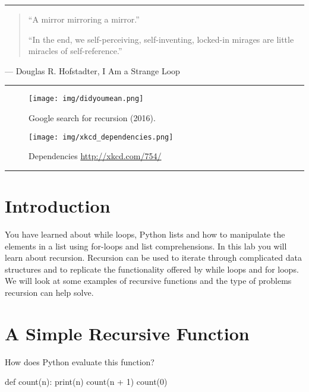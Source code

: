 \documentclass[11pt]{cselabheader}
\title{\thetitle}
\author{\theauthor}
\date{NMT Department of Computer Science and Engineering}
\begin{document}
\maketitle
\hrule


\begin{quote}
``A mirror mirroring a mirror.''

``In the end, we self-perceiving, self-inventing, locked-in mirages
are little miracles of self-reference.''
\end{quote}
\begin{flushright}
--- Douglas R. Hofstadter, I Am a Strange Loop
\end{flushright}

\hrule

\begin{figure}[H]
  \centering
  \texttt{[image: img/didyoumean.png]}
  \caption{Google search for recursion (2016).}
\end{figure}

\begin{figure}[H]
  \centering
  \texttt{[image: img/xkcd\_dependencies.png]}
  \caption{Dependencies \url{http://xkcd.com/754/}}
\end{figure}

\hrule

\newpage
\section*{Introduction}

You have learned about while loops, Python lists and how to manipulate
the elements in a list using for-loops and list comprehensions.  In
this lab you will learn about recursion.  Recursion can be used to
iterate through complicated data structures and to replicate the
functionality offered by while loops and for loops.  We will look at
some examples of recursive functions and the type of problems
recursion can help solve.

\tableofcontents

\newpage
{}

\section{A Simple Recursive Function}

How does Python evaluate this function?

\begin{python3code}
def count(n):
    print(n)
    count(n + 1)
count(0)
\end{python3code}
\end{document}
